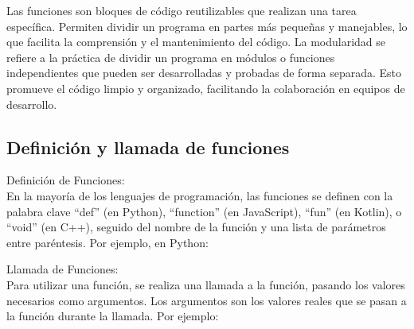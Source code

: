 
Las funciones son bloques de código reutilizables que realizan una tarea específica. Permiten dividir un programa en partes más pequeñas y manejables, lo que facilita la comprensión y el mantenimiento del código. La modularidad se refiere a la práctica de dividir un programa en módulos o funciones independientes que pueden ser desarrolladas y probadas de forma separada. Esto promueve el código limpio y organizado, facilitando la colaboración en equipos de desarrollo.

\subsection{Definición y llamada de funciones}

Definición de Funciones:\\
  
En la mayoría de los lenguajes de programación, las funciones se definen con la palabra clave ``def'' (en Python), ``function'' (en JavaScript), ``fun'' (en Kotlin), o ``void'' (en C++), seguido del nombre de la función y una lista de parámetros entre paréntesis. Por ejemplo, en Python:
\begin{figure}[h]
    \centering
  \end{figure}

  \newpage

Llamada de Funciones:\\

Para utilizar una función, se realiza una llamada a la función, pasando los valores necesarios como argumentos. Los argumentos son los valores reales que se pasan a la función durante la llamada. Por ejemplo:

